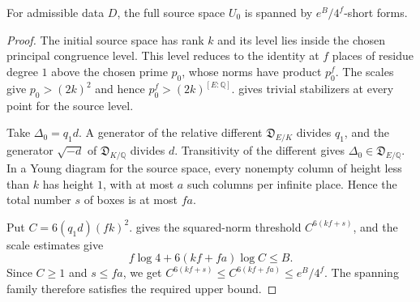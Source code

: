 \begin{lemma}
\label{lem:a-short-source-basis}
\emitthmsource
For admissible data $D$, the full source space $U_0$ is spanned by $e^B/4^f$-short forms.
\end{lemma}
\begin{proof}
The initial source space has rank $k$ and its level lies inside the chosen principal congruence level. This level reduces to the identity at $f$ places of residue degree $1$ above the chosen prime $p_0$, whose norms have product $p_0^f$. The scales give $p_0>(2k)^2$ and hence $p_0^f>(2k)^{[E:\mathbb Q]}$.  gives trivial stabilizers at every point for the source level.

Take $\Delta_0=q_1d$. A generator of the relative different $\mathfrak D_{E/K}$ divides $q_1$, and the generator $\sqrt{-d}$ of $\mathfrak D_{K/\mathbb Q}$ divides $d$. Transitivity of the different gives $\Delta_0\in\mathfrak D_{E/\mathbb Q}$. In a Young diagram for the source space, every nonempty column of height less than $k$ has height $1$, with at most $a$ such columns per infinite place. Hence the total number $s$ of boxes is at most $fa$.

Put $C=6(q_1d)(fk)^2$.  gives the squared-norm threshold $C^{6(kf+s)}$, and the scale estimates give
\[
 f\log 4+6(kf+fa)\log C\le B .
\]
Since $C\ge1$ and $s\le fa$, we get
$C^{6(kf+s)}\le C^{6(kf+fa)}\le e^B/4^f$. The spanning family therefore satisfies the required upper bound.
\end{proof}

